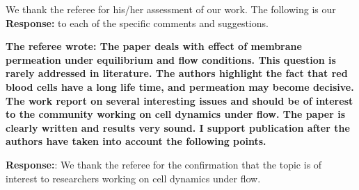 \documentclass[11pt]{article}
\begin{document}
We thank the referee for his/her assessment of our work.  
The following is
our {\bf Response:} to each of the specific comments and suggestions.


{\bf The referee wrote:
The paper deals with effect of membrane permeation under equilibrium
and flow conditions. This question is rarely addressed in literature.
The authors highlight the fact that red blood cells have a long life
time, and permeation may become decisive. The work report on several
interesting issues and should be of interest to the community working
on cell dynamics under flow. The paper is clearly written and results
very sound. I support publication after the authors have taken into
account the following points.
}

\noindent
{\bf Response:}: We thank the referee for the confirmation that the topic is of interest to researchers working on cell dynamics under flow.
\end{document}
